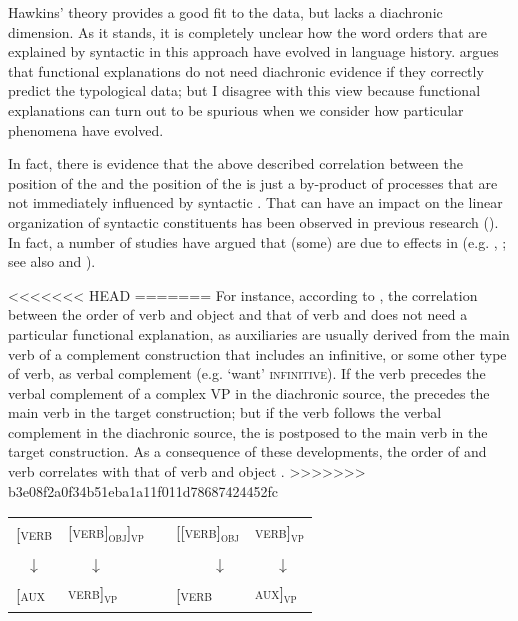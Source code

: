 \documentclass[output=paper]{langsci/langscibook}
\begin{document}
Hawkins’ theory provides a good fit to the data, but lacks a diachronic dimension. As it stands, it is completely unclear how the word orders that are explained by syntactic  in this approach have evolved in language history.  argues that functional explanations do not need diachronic evidence if they correctly predict the typological data; but I disagree with this view because functional explanations can turn out to be spurious when we consider how particular phenomena have evolved.

In fact, there is evidence that the above described correlation between the position of the  and the position of the  is just a by-product of  processes that are not immediately influenced by syntactic . That  can have an impact on the linear organization of syntactic constituents has been observed in previous research (\citealt{Li1974_Chin}). In fact, a number of studies have argued that (some)  are due to  effects in  (e.g. \citealt{Givón1975}, \citealt{Aristar1991,Bybee2010,Collins2012}; see also  and ). 

\largerpage

<<<<<<< HEAD
=======
\largerpage
For instance, according to \citet[111]{Bybee2010}, the correlation between the order of verb and object and that of verb and  does not need a particular functional explanation, as auxiliaries are usually derived from the main verb of a complement construction that includes an infinitive, or some other type of verb, as verbal complement (e.g. `want' \textsc{infinitive}). If the verb precedes the verbal complement of a complex VP in the diachronic source, the  precedes the main verb in the target construction; but if the verb follows the verbal complement in the diachronic source, the  is postposed to the main verb in the target construction. As a consequence of these developments, the order of  and verb correlates with that of verb and object .
>>>>>>> b3e08f2a0f34b51eba1a11f011d78687424452fc

\ea\label{ex:diessel:18}
\begin{tabular}[t]{@{}llcll@{}}
{[\textsc{verb}} & {\textsc{[verb]\textsubscript{obj}]\textsubscript{vp}}} & \hspace{2cm} & {\textsc{[[verb]\textsubscript{obj}}} & {\textsc{verb]\textsubscript{vp}}} \\
\multicolumn{1}{c}{↓}  & ~~~↓ & & ~~~~~↓ & ~~~↓\\
{\textsc{[aux}}  & {\textsc{verb]\textsubscript{vp}}}                      &  & {\textsc{[verb}}  & {\textsc{aux]\textsubscript{vp}}}\\
\end{tabular}
\z
\end{document}
